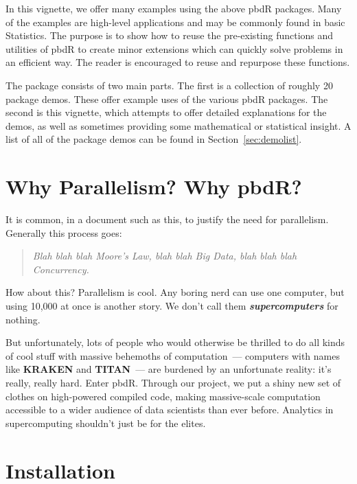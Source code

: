 In this vignette, we offer many examples using the above pbdR packages.  Many of the examples are high-level
applications and may be commonly found in basic Statistics.  The purpose is to show how to reuse the pre-existing functions and utilities of pbdR to create minor extensions which can quickly solve problems in an efficient way.  The reader is encouraged to reuse and repurpose these functions.

The  package consists of two main parts.  The first is a collection of roughly 20 package demos.  These offer example uses of the various pbdR packages.  The second is this vignette, which attempts to offer detailed explanations for the demos, as well as sometimes providing some mathematical or statistical insight.  A list of all of the package demos can be found in Section~\ref{sec:demolist}.



\section{Why Parallelism?  Why pbdR?}

It is common, in a document such as this, to justify the need for parallelism.  Generally this process goes:

\begin{quote}
\emph{
Blah blah blah Moore's Law, blah blah Big Data, blah blah blah Concurrency.
}
\end{quote}

How about this?  Parallelism is cool.  Any boring nerd can use one computer, but using 10,000 at once is another story.  We don't call them \emph{\textbf{supercomputers}} for nothing.

But unfortunately, lots of people who would otherwise be thrilled to do all kinds of cool stuff with massive behemoths of computation~--- computers with names like \textbf{KRAKEN} and \textbf{TITAN}~--- are burdened by an unfortunate reality:  it's really, really hard.  Enter pbdR.  Through our project, we put a shiny new set of clothes on high-powered compiled code, making massive-scale computation accessible to a wider audience of data scientists than ever before.  Analytics in supercomputing shouldn't just be for the elites.



\section[Installation]{Installation}
\label{sec:installation}

